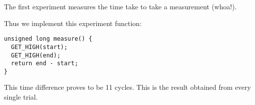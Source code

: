 The first experiment measures the time take to take a measurement (whoa!).

Thus we implement this experiment function: 
\begin{verbatim}
unsigned long measure() {
  GET_HIGH(start);
  GET_HIGH(end);
  return end - start;
}
\end{verbatim}

This time difference proves to be 11 cycles. This is the result obtained from every single trial.
